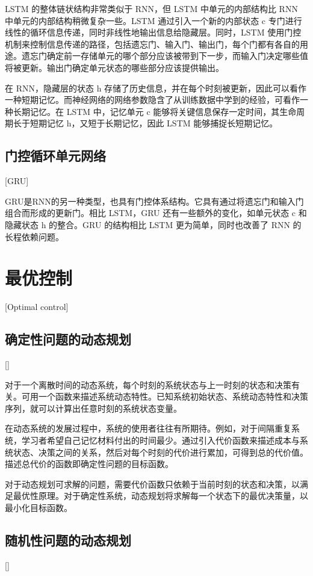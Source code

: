 LSTM 的整体链状结构非常类似于 RNN，但 LSTM 中单元的内部结构比 RNN 中单元的内部结构稍微复杂一些。LSTM 通过引入一个新的内部状态 c 专门进行线性的循环信息传递，同时非线性地输出信息给隐藏层。同时，LSTM 使用门控机制来控制信息传递的路径，包括遗忘门、输入门、输出门，每个门都有各自的用途。遗忘门确定前一存储单元的哪个部分应该被带到下一步，而输入门决定哪些值将被更新。输出门确定单元状态的哪些部分应该提供输出。

在 RNN，隐藏层的状态 h 存储了历史信息，并在每个时刻被更新，因此可以看作一种短期记忆。而神经网络的网络参数隐含了从训练数据中学到的经验，可看作一种长期记忆。在 LSTM 中，记忆单元 c 能够将关键信息保存一定时间，其生命周期长于短期记忆 h，又短于长期记忆，因此 LSTM 能够捕捉长短期记忆。

\subsection{门控循环单元网络}[GRU]

GRU是RNN的另一种类型，也具有门控体系结构。它具有通过将遗忘门和输入门组合而形成的更新门。相比 LSTM，GRU 还有一些额外的变化，如单元状态 c 和隐藏状态 h 的整合。GRU 的结构相比 LSTM 更为简单，同时也改善了 RNN 的长程依赖问题。

\section{最优控制}[Optimal control]

\subsection{确定性问题的动态规划}[]

对于一个离散时间的动态系统，每个时刻的系统状态与上一时刻的状态和决策有关。可用一个函数来描述系统动态特性。已知系统初始状态、系统动态特性和决策序列，就可以计算出任意时刻的系统状态变量。

在动态系统的发展过程中，系统的使用者往往有所期待。例如，对于间隔重复系统，学习者希望自己记忆材料付出的时间最少。通过引入代价函数来描述成本与系统状态、决策之间的关系，然后对每个时刻的代价进行累加，可得到总的代价值。描述总代价的函数即确定性问题的目标函数。

对于动态规划可求解的问题，需要代价函数只依赖于当前时刻的状态和决策，以满足最优性原理。对于确定性系统，动态规划将求解每一个状态下的最优决策量，以最小化目标函数。

\subsection{随机性问题的动态规划}[]

